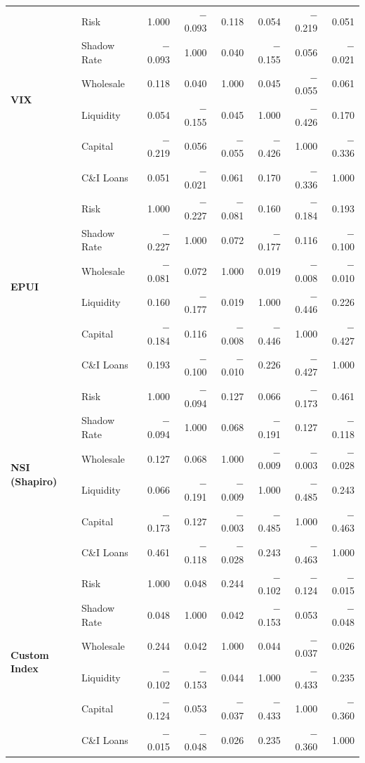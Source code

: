 \documentclass[12pt,a4paper]{report}
\begin{document}
\begin{table}[H]
{\begin{tabular}{ll rrrrrr}
\multirow{6}{*}{\textbf{VIX}}
 & Risk          &  1.000 & $-$0.093 &  0.118 &  0.054 & $-$0.219 &  0.051 \\
 & Shadow Rate   & $-$0.093 &  1.000 &  0.040 & $-$0.155 &  0.056 & $-$0.021 \\
 & Wholesale     &  0.118 &  0.040 &  1.000 &  0.045 & $-$0.055 &  0.061 \\
 & Liquidity     &  0.054 & $-$0.155 &  0.045 &  1.000 & $-$0.426 &  0.170 \\
 & Capital       & $-$0.219 &  0.056 & $-$0.055 & $-$0.426 &  1.000 & $-$0.336 \\
 & C\&I Loans    &  0.051 & $-$0.021 &  0.061 &  0.170 & $-$0.336 &  1.000 \\
\midrule

\multirow{6}{*}{\textbf{EPUI}}
 & Risk          &  1.000 & $-$0.227 & $-$0.081 &  0.160 & $-$0.184 &  0.193 \\
 & Shadow Rate   & $-$0.227 &  1.000 &  0.072 & $-$0.177 &  0.116 & $-$0.100 \\
 & Wholesale     & $-$0.081 &  0.072 &  1.000 &  0.019 & $-$0.008 & $-$0.010 \\
 & Liquidity     &  0.160 & $-$0.177 &  0.019 &  1.000 & $-$0.446 &  0.226 \\
 & Capital       & $-$0.184 &  0.116 & $-$0.008 & $-$0.446 &  1.000 & $-$0.427 \\
 & C\&I Loans    &  0.193 & $-$0.100 & $-$0.010 &  0.226 & $-$0.427 &  1.000 \\
\midrule

\multirow{6}{*}{\textbf{NSI (Shapiro)}}
 & Risk          &  1.000 & $-$0.094 &  0.127 &  0.066 & $-$0.173 &  0.461 \\
 & Shadow Rate   & $-$0.094 &  1.000 &  0.068 & $-$0.191 &  0.127 & $-$0.118 \\
 & Wholesale     &  0.127 &  0.068 &  1.000 & $-$0.009 & $-$0.003 & $-$0.028 \\
 & Liquidity     &  0.066 & $-$0.191 & $-$0.009 &  1.000 & $-$0.485 &  0.243 \\
 & Capital       & $-$0.173 &  0.127 & $-$0.003 & $-$0.485 &  1.000 & $-$0.463 \\
 & C\&I Loans    &  0.461 & $-$0.118 & $-$0.028 &  0.243 & $-$0.463 &  1.000 \\
\midrule

\multirow{6}{*}{\textbf{Custom Index}}
 & Risk          &  1.000 &  0.048 &  0.244 & $-$0.102 & $-$0.124 & $-$0.015 \\
 & Shadow Rate   &  0.048 &  1.000 &  0.042 & $-$0.153 &  0.053 & $-$0.048 \\
 & Wholesale     &  0.244 &  0.042 &  1.000 &  0.044 & $-$0.037 &  0.026 \\
 & Liquidity     & $-$0.102 & $-$0.153 &  0.044 &  1.000 & $-$0.433 &  0.235 \\
 & Capital       & $-$0.124 &  0.053 & $-$0.037 & $-$0.433 &  1.000 & $-$0.360 \\
 & C\&I Loans    & $-$0.015 & $-$0.048 &  0.026 &  0.235 & $-$0.360 &  1.000 \\
\midrule


\end{tabular}}
\end{table}
\end{document}
